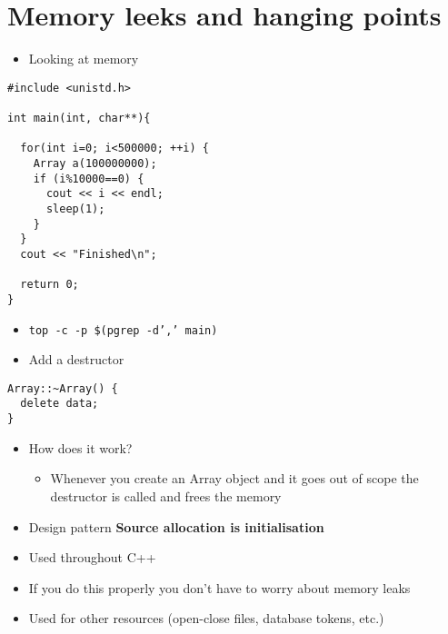 \documentclass[11pt]{article}
\begin{document}
\section{Memory leeks and hanging points}
\label{sec:orga55e0bf}
\begin{itemize}
\item Looking at memory
\end{itemize}
\begin{verbatim}
#include <unistd.h>

int main(int, char**){

  for(int i=0; i<500000; ++i) {
    Array a(100000000);
    if (i%10000==0) {
      cout << i << endl;
      sleep(1);
    }
  }
  cout << "Finished\n";

  return 0;
}
\end{verbatim}
\begin{itemize}
\item \texttt{top -c -p \$(pgrep -d',' main)}
\item Add a destructor
\end{itemize}
\begin{verbatim}
Array::~Array() {
  delete data;
}
\end{verbatim}
\begin{itemize}
\item How does it work?
\begin{itemize}
\item Whenever you create an Array object and it goes out of scope the
destructor is called and frees the memory
\end{itemize}
\item Design pattern \textbf{Source allocation is initialisation}
\item Used throughout C++
\item If you do this properly you don't have to worry about memory leaks
\item Used for other resources (open-close files, database tokens, etc.)
\end{itemize}
\end{document}
